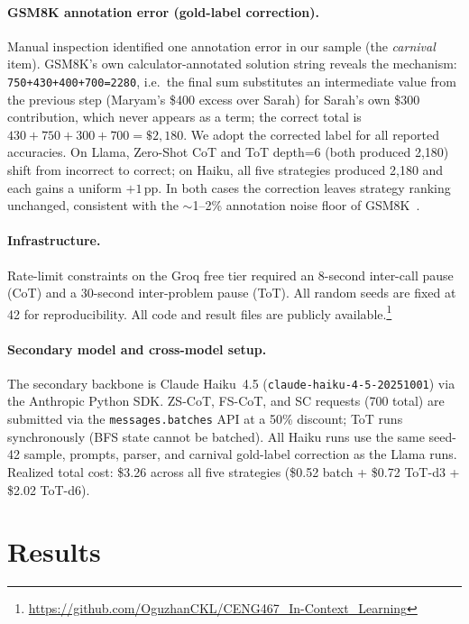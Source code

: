 ﻿\documentclass[runningheads]{llncs}
\begin{document}
\paragraph{GSM8K annotation error (gold-label correction).}
Manual inspection identified one annotation error in our sample (the
\textit{carnival} item). GSM8K's own calculator-annotated solution
string reveals the mechanism: \texttt{750+430+400+700=2280}, i.e.\ the
final sum substitutes an intermediate value from the previous step
(Maryam's \$400 excess over Sarah) for Sarah's own \$300 contribution,
which never appears as a term; the correct total is
$430+750+300+700=\$2{,}180$. We adopt the corrected label for all
reported accuracies. On Llama, Zero-Shot CoT and ToT depth=6 (both
produced 2{,}180) shift from incorrect to correct; on Haiku, all five
strategies produced 2{,}180 and each gains a uniform $+1$\,pp. In both
cases the correction leaves strategy ranking unchanged, consistent with
the $\sim$1--2\% annotation noise floor of GSM8K~\cite{cobbe2021gsm8k}.

\paragraph{Infrastructure.}
Rate-limit constraints on the Groq free tier required an 8-second
inter-call pause (CoT) and a 30-second inter-problem pause (ToT).
All random seeds are fixed at 42 for reproducibility.
All code and result files are publicly available.\footnote{\url{https://github.com/OguzhanCKL/CENG467_In-Context_Learning}}

\paragraph{Secondary model and cross-model setup.}
\label{sec:setup:crossmodel}
The secondary backbone is Claude Haiku~4.5
(\texttt{claude-haiku-4-5-20251001}) via the Anthropic Python SDK.
ZS-CoT, FS-CoT, and SC requests (700 total) are submitted via the
\texttt{messages.batches} API at a 50\% discount; ToT runs
synchronously (BFS state cannot be batched).
All Haiku runs use the same seed-42 sample, prompts, parser, and
carnival gold-label correction as the Llama runs.
Realized total cost: \$3.26 across all five strategies
(\$0.52 batch + \$0.72 ToT-d3 + \$2.02 ToT-d6).

\section{Results}
\label{sec:results}
\end{document}
